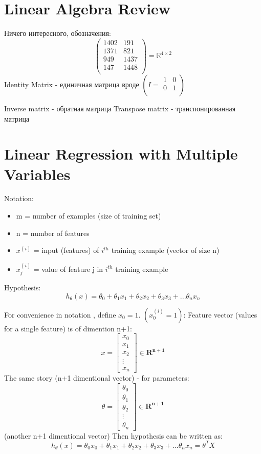 \documentclass{scrartcl}
\begin{document}
\section {Linear Algebra Review}
Ничего интересного, обозначения:
\[
\left( \begin{array}{cc}
    1402 & 191 \\
    1371 & 821 \\ 949 & 1437 \\ 147 & 1448 \\
  \end{array} \right) = \mathbb{R}^{4\times2}
\]
Identity Matrix - единичная матрица вроде $\left( I
  = \begin{array}{cc}
    1 & 0 \\ 0 & 1 \\
  \end{array}
\right)$


Inverse matrix - обратная матрица Transpose matrix - транспонированная
матрица

\label{Chapter 4}
\section {Linear Regression with Multiple Variables}

Notation: 
\begin{itemize}
\item {m} = number of examples (size of training set)
\item {n} = number of features
\item{$x^{(i)}$} = input (features) of $i^{th}$ training example
  (vector of size n)
\item {$x_j^{(i)}$} = value of feature j in $i^{th}$ training example
\end{itemize}

Hypothesis: 
\[ h_\theta(x) = \theta_0 + \theta_1x_1 + \theta_2x_2 + \theta_3x_3 + ...
\theta_nx_n \]

For convenience in notation , define $x_0=1$. $(x_0^{(i)}=1)$: Feature
vector (values for a single feature) is of dimention n+1:
\[ x = \left[ \begin{array}{c} x_0 \\ x_1 \\ x_2 \\ \vdots \\ x_n
  \end{array} \right] \in \mathbf{R^{n+1}} \]
The same story (n+1 dimentional vector) - for parameters:
\[
\theta = \left[ \begin{array}{c} \theta_0 \\ \theta_1 \\ \theta_2 \\
    \vdots \\ \theta_n
  \end{array} \right] \in \mathbf{R^{n+1}}
\]
(another n+1 dimentional vector) Then hypothesis can be written as:
\[
h_\theta(x) = \theta_0x_0 + \theta_1x_1 + \theta_2x_2 + \theta_3x_3 +
... \theta_nx_n = \theta^TX \]
\end{document}
